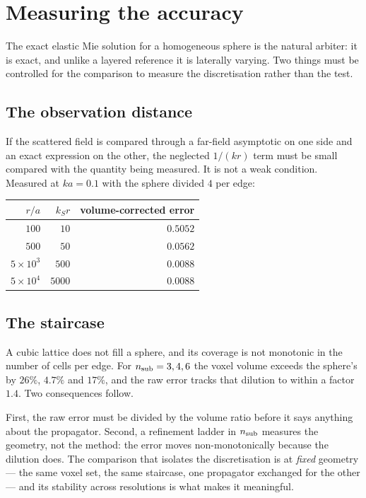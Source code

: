 \documentclass[11pt,a4paper]{article}
\begin{document}
\section{Measuring the accuracy}\label{sec:measure}

The exact elastic Mie solution for a homogeneous sphere is the natural arbiter:
it is exact, and unlike a layered reference it is laterally varying.  Two
things must be controlled for the comparison to measure the discretisation
rather than the test.

\subsection{The observation distance}

If the scattered field is compared through a far-field asymptotic on one side
and an exact expression on the other, the neglected $1/(kr)$ term must be
small compared with the quantity being measured.  It is not a weak condition.
Measured at $ka = 0.1$ with the sphere divided $4$ per edge:

\begin{center}
\begin{tabular}{@{}rrr@{}}
\toprule
$r/a$ & $k_S r$ & volume-corrected error\\
\midrule
$100$ & $10$ & $0.5052$\\
$500$ & $50$ & $0.0562$\\
$5\times10^{3}$ & $500$ & $0.0088$\\
$5\times10^{4}$ & $5000$ & $0.0088$\\
\bottomrule
\end{tabular}
\end{center}

\subsection{The staircase}

A cubic lattice does not fill a sphere, and its coverage is not monotonic in
the number of cells per edge.  For $n_{\rm sub} = 3,4,6$ the voxel volume
exceeds the sphere's by $26\%$, $4.7\%$ and $17\%$, and the raw error tracks
that dilution to within a factor $1.4$.  Two consequences follow.

First, the raw error must be divided by the volume ratio before it says
anything about the propagator.  Second, a refinement ladder in $n_{\rm sub}$
measures the geometry, not the method: the error moves non-monotonically
because the dilution does.  The comparison that isolates the discretisation is
at \emph{fixed} geometry --- the same voxel set, the same staircase, one
propagator exchanged for the other --- and its stability across resolutions is
what makes it meaningful.
\end{document}
